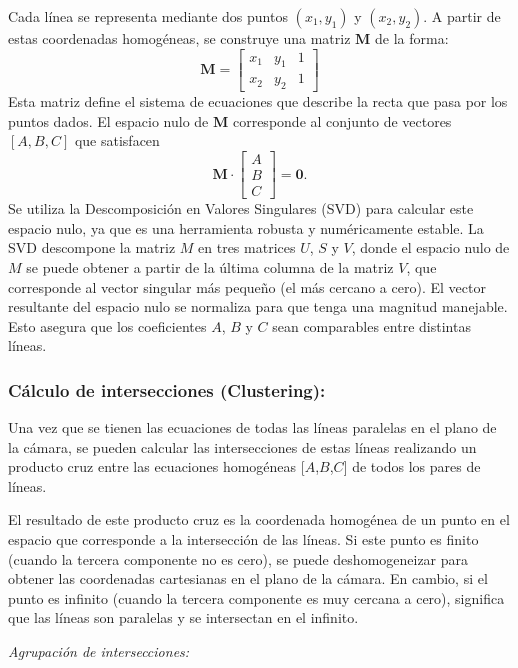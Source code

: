 

Cada línea se representa mediante dos puntos $(x_1, y_1)$ y $(x_2, y_2)$. A partir de estas coordenadas homogéneas,
se construye una matriz $\mathbf{M}$ de la forma:
\[
    \mathbf{M} = \begin{bmatrix}
        x_1 & y_1 & 1 \\
        x_2 & y_2 & 1
    \end{bmatrix}
\]
Esta matriz define el sistema de ecuaciones que describe la recta que pasa por los puntos dados.
El espacio nulo de $\mathbf{M}$ corresponde al conjunto de vectores $[A,B,C]$ que satisfacen
\[
    \mathbf{M} \cdot \begin{bmatrix}
        A \\ B \\ C
    \end{bmatrix} = \mathbf{0}.
\]
Se utiliza la Descomposición en Valores Singulares (SVD) \cite{golub2013matrix} para calcular este espacio nulo, ya que es una herramienta robusta y numéricamente estable.
La SVD descompone la matriz \(M\) en tres matrices \(U\), \(S\) y \(V\), donde el espacio nulo de \(M\) se puede obtener a partir de la última columna de la matriz \(V\), que corresponde al vector singular más pequeño (el más cercano a cero).
El vector resultante del espacio nulo se normaliza para que tenga una magnitud manejable.
Esto asegura que los coeficientes \(A\), \(B\) y \(C\) sean comparables entre distintas líneas.

\subsubsection{Cálculo de intersecciones (Clustering):}
\noindent
Una vez que se tienen las ecuaciones de todas las líneas paralelas en el plano de la cámara, se pueden calcular las intersecciones de estas líneas realizando un producto cruz entre las ecuaciones homogéneas [\(A\),\(B\),\(C\)] de todos los pares de líneas.

El resultado de este producto cruz es la coordenada homogénea de un punto en el espacio que corresponde a la intersección de las líneas.
Si este punto es finito (cuando la tercera componente no es cero), se puede deshomogeneizar para obtener las coordenadas cartesianas en el plano de la cámara.
En cambio, si el punto es infinito (cuando la tercera componente es muy cercana a cero), significa que las líneas son paralelas y se intersectan en el infinito.


\textit{Agrupación de intersecciones:}

